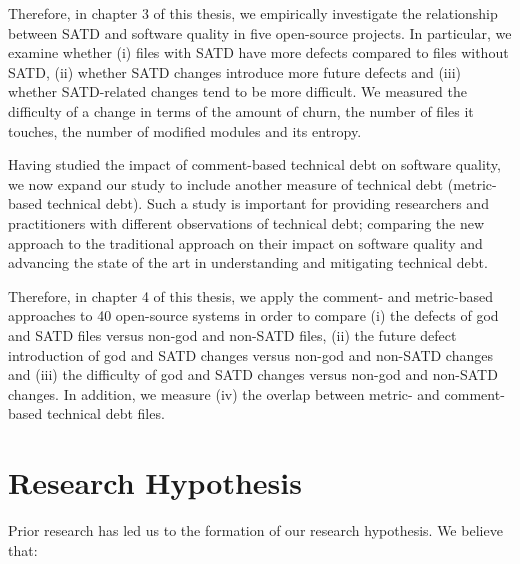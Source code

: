Therefore, in chapter 3 of this thesis, we empirically investigate the relationship between SATD and software quality in five open-source projects. In particular, we examine whether (i) files with SATD have more defects compared to files without SATD, (ii) whether SATD changes introduce more future defects and (iii) whether SATD-related changes tend to be more difficult. We measured the difficulty of a change in terms of the amount of churn, the number of files it touches, the number of modified modules and its entropy. \par

Having studied the impact of comment-based technical debt on software quality, we now expand our study to include another measure of technical debt (metric-based technical debt). Such a study is important for providing researchers and practitioners with different observations of technical debt; comparing the new approach to the traditional approach on their impact on software quality and advancing the state of the art in understanding and mitigating technical debt.\par


Therefore, in chapter 4 of this thesis, we apply the comment- and metric-based approaches to 40 open-source systems in order to compare (i) the defects of god and SATD files versus non-god and non-SATD files, (ii) the future defect introduction of god and SATD changes versus non-god and non-SATD changes and (iii) the difficulty of god and SATD changes versus non-god and non-SATD changes. In addition, we measure (iv) the overlap between metric- and comment-based technical debt files.




\section{Research Hypothesis}
Prior research has led us to the formation of our research hypothesis. We believe that:

 
